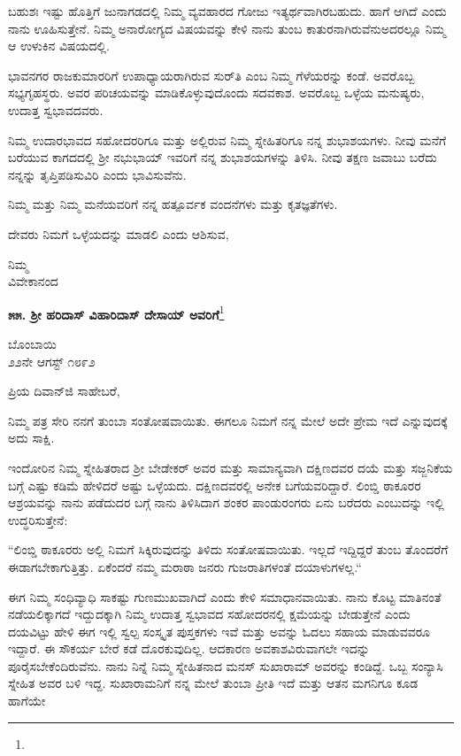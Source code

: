 ಬಹುಶಃ ಇಷ್ಟು ಹೊತ್ತಿಗೆ ಜುನಾಗಡದಲ್ಲಿ ನಿಮ್ಮ ವ್ಯವಹಾರದ ಗೋಜು ಇತ್ಯರ್ಥವಾಗಿರಬಹುದು. ಹಾಗೆ ಆಗಿದೆ ಎಂದು ನಾನು ಊಹಿಸುತ್ತೇನೆ. ನಿಮ್ಮ ಅನಾರೋಗ್ಯದ ವಿಷಯವನ್ನು ಕೇಳಿ ನಾನು ತುಂಬ ಕಾತುರನಾಗಿರುವೆನು\enginline{-}ಅದರಲ್ಲೂ ನಿಮ್ಮ ಆ ಉಳುಕಿನ ವಿಷಯದಲ್ಲಿ.

ಭಾವನಗರ ರಾಜಕುಮಾರರಿಗೆ ಉಪಾಧ್ಯಾಯರಾಗಿರುವ ಸುರ್‌ತಿ ಎಂಬ ನಿಮ್ಮ ಗೆಳೆಯರನ್ನು ಕಂಡೆ. ಅವರೊಬ್ಬ ಸಭ್ಯಗೃಹಸ್ಥರು. ಅವರ ಪರಿಚಯವನ್ನು ಮಾಡಿಕೊಳ್ಳುವುದೊಂದು ಸದವಕಾಶ. ಅವರೊಬ್ಬ ಒಳ್ಳೆಯ ಮನುಷ್ಯರು, ಉದಾತ್ತ ಸ್ವಭಾವದವರು.

ನಿಮ್ಮ ಉದಾರಭಾವದ ಸಹೋದರರಿಗೂ ಮತ್ತು ಅಲ್ಲಿರುವ ನಿಮ್ಮ ಸ್ನೇಹಿತರಿಗೂ ನನ್ನ ಶುಭಾಶಯಗಳು. ನೀವು ಮನೆಗೆ ಬರೆಯುವ ಕಾಗದದಲ್ಲಿ ಶ‍್ರೀ ನಭುಭಾಯ್ ಇವರಿಗೆ ನನ್ನ ಶುಭಾಶಯಗಳನ್ನು ತಿಳಿಸಿ. ನೀವು ತಕ್ಷಣ ಜವಾಬು ಬರೆದು ನನ್ನನ್ನು ತೃಪ್ತಿಪಡಿಸುವಿರಿ ಎಂದು ಭಾವಿಸುವೆನು.

ನಿಮ್ಮ ಮತ್ತು ನಿಮ್ಮ ಮನೆಯವರಿಗೆ ನನ್ನ ಹತ್ಪೂರ್ವಕ ವಂದನೆಗಳು ಮತ್ತು ಕೃತಜ್ಞತೆಗಳು.

ದೇವರು ನಿಮಗೆ ಒಳ್ಳೆಯದನ್ನು ಮಾಡಲಿ ಎಂದು ಆಶಿಸುವ,

{\flushright
ನಿಮ್ಮ\\ವಿವೇಕಾನಂದ\par}

\begin{center}
\textbf{೫೫. ಶ‍್ರೀ ಹರಿದಾಸ್ ವಿಹಾರಿದಾಸ್ ದೇಸಾಯ್ ಅವರಿಗೆ}\footnote{}
\end{center}

\begin{flushright}
ಬೊಂಬಾಯಿ\\೨೨ನೇ ಆಗಸ್ಟ್ ೧೮೯೨
\end{flushright}

\noindent
ಪ್ರಿಯ ದಿವಾನ್‌ಜಿ ಸಾಹೇಬರೆ,

ನಿಮ್ಮ ಪತ್ರ ಸೇರಿ ನನಗೆ ತುಂಬಾ ಸಂತೋಷವಾಯಿತು. ಈಗಲೂ ನಿಮಗೆ ನನ್ನ ಮೇಲೆ ಅದೇ ಪ್ರೇಮ ಇದೆ ಎನ್ನುವುದಕ್ಕೆ ಅದು ಸಾಕ್ಷಿ.

ಇಂದೋರಿನ ನಿಮ್ಮ ಸ್ನೇಹಿತರಾದ ಶ‍್ರೀ ಬೇಡೇಕರ್‌ ಅವರ ಮತ್ತು ಸಾಮಾನ್ಯವಾಗಿ ದಕ್ಷಿಣದವರ ದಯೆ ಮತ್ತು ಸಜ್ಜನಿಕೆಯ ಬಗ್ಗೆ ಎಷ್ಟು ಕಡಿಮೆ ಹೇಳಿದರೆ ಅಷ್ಟು ಒಳ್ಳೆಯದು. ದಕ್ಷಿಣದವರಲ್ಲಿ ಅನೇಕ ಬಗೆಯವರಿದ್ದಾರೆ. ಲಿಂಬ್ಡಿ ಠಾಕೂರರ ಆಶ್ರಯವನ್ನು ನಾನು ಪಡೆದುದರ ಬಗ್ಗೆ ನಾನು ತಿಳಿಸಿದಾಗ ಶಂಕರ ಪಾಂಡುರಂಗರು ಏನು ಬರೆದರು ಎಂಬುದನ್ನು ಇಲ್ಲಿ ಉದ್ಧರಿಸುತ್ತೇನೆ:

“ಲಿಂಬ್ಡಿ ಠಾಕೂರರು ಅಲ್ಲಿ ನಿಮಗೆ ಸಿಕ್ಕಿರುವುದನ್ನು ತಿಳಿದು ಸಂತೋಷವಾಯಿತು. ಇಲ್ಲದೆ ಇದ್ದಿದ್ದರೆ ತುಂಬ ತೊಂದರೆಗೆ ಈಡಾಗಬೇಕಾಗುತ್ತಿತ್ತು. ಏಕೆಂದರೆ ನಮ್ಮ ಮರಾಠಾ ಜನರು ಗುಜರಾತಿಗಳಂತೆ ದಯಾಳುಗಳಲ್ಲ.“

ಈಗ ನಿಮ್ಮ ಸಂಧಿವ್ಯಾಧಿ ಸಾಕಷ್ಟು ಗುಣಮುಖವಾಗಿದೆ ಎಂದು ಕೇಳಿ ಸಮಾಧಾನವಾಯಿತು. ನಾನು ಕೊಟ್ಟ ಮಾತಿನಂತೆ ನಡೆಯಲಿಕ್ಕಾಗದೆ ಇದ್ದುದಕ್ಕಾಗಿ ನಿಮ್ಮ ಉದಾತ್ತ ಸ್ವಭಾವದ ಸಹೋದರನಲ್ಲಿ ಕ್ಷಮೆಯನ್ನು ಬೇಡುತ್ತೇನೆ ಎಂದು ದಯವಿಟ್ಟು ಹೇಳಿ ಈಗ ಇಲ್ಲಿ ಸ್ವಲ್ಪ ಸಂಸ್ಕೃತ ಪುಸ್ತಕಗಳು ಇವೆ ಮತ್ತು ಅವನ್ನು ಓದಲು ಸಹಾಯ ಮಾಡುವವರೂ ಇದ್ದಾರೆ. ಈ ಸೌಕರ್ಯ ಬೇರೆ ಕಡೆ ದೊರಕುವುದಿಲ್ಲ. ಆದಕಾರಣ ಅವಕಾಶವಿರುವಾಗಲೇ ಇದನ್ನು ಪೂರೈಸಬೇಕೆಂದಿರುವೆನು. ನಾನು ನಿನ್ನೆ ನಿಮ್ಮ ಸ್ನೇಹಿತನಾದ ಮನಸ್ ಸುಖಾರಾಮ್ ಅವರನ್ನು ಕಂಡಿದ್ದೆ. ಒಬ್ಬ ಸಂನ್ಯಾಸಿ ಸ್ನೇಹಿತ ಅವರ ಬಳಿ ಇದ್ದ. ಸುಖಾರಾಮನಿಗೆ ನನ್ನ ಮೇಲೆ ತುಂಬಾ ಪ್ರೀತಿ ಇದೆ ಮತ್ತು ಆತನ ಮಗನಿಗೂ ಕೂಡ ಹಾಗೆಯೇ

